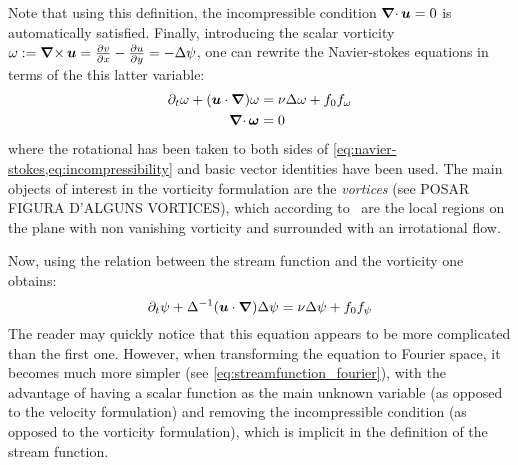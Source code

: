 \documentclass[../main.tex]{subfiles}
\begin{document}
Note that using this definition, the incompressible condition $\operatorname{\boldsymbol{\nabla}\cdot} \boldsymbol{u}=0$ is automatically satisfied. Finally, introducing the scalar vorticity $\omega := \operatorname{\boldsymbol{\nabla}\times} \boldsymbol{u} = \pdv{v}{x} - \pdv{u}{y}=-\Delta \psi$, one can rewrite the Navier-stokes equations in terms of the this latter variable:
\begin{align}
	\partial_t \omega + (\boldsymbol{u} \cdot \grad) \omega & = \nu \Delta \omega + f_0f_\omega \\
	\operatorname{\boldsymbol{\nabla}\cdot}{\boldsymbol{\omega}}                              & = 0
\end{align}
where the rotational has been taken to both sides of \cref{eq:navier-stokes,eq:incompressibility} and basic vector identities have been used. The main objects of interest in the vorticity formulation are the \emph{vortices} (see POSAR FIGURA D'ALGUNS VORTICES), which according to~\cite{Saffman} are the local regions on the plane with non vanishing vorticity and surrounded with an irrotational flow.

Now, using the relation between the stream function and the vorticity one obtains:
\begin{equation}\label{eq:streamfunction}
	\partial_t \psi + \Delta^{-1} (\boldsymbol{u} \cdot \grad) \Delta \psi = \nu \Delta \psi + f_0f_\psi
\end{equation}
The reader may quickly notice that this equation appears to be more complicated than the first one. However, when transforming the equation to Fourier space, it becomes much more simpler (see \cref{eq:streamfunction_fourier}), with the advantage of having a scalar function as the main unknown variable (as opposed to the velocity formulation) and removing the incompressible condition (as opposed to the vorticity formulation), which is implicit in the definition of the stream function.
\end{document}

